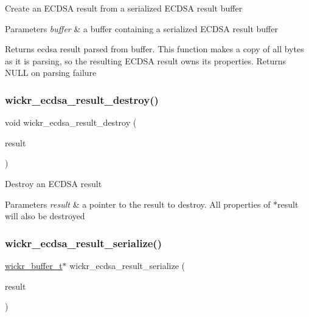 Create an E\+C\+D\+SA result from a serialized E\+C\+D\+SA result buffer


\begin{DoxyParams}{Parameters}
{\em buffer} & a buffer containing a serialized E\+C\+D\+SA result buffer \\
\hline
\end{DoxyParams}
\begin{DoxyReturn}{Returns}
ecdsa result parsed from \textquotesingle{}buffer\textquotesingle{}. This function makes a copy of all bytes as it is parsing, so the resulting E\+C\+D\+SA result owns its properties. Returns N\+U\+LL on parsing failure 
\end{DoxyReturn}
\mbox{\label{group__wickr__ecdsa__result_ga84fb120b34b4b7ede4042009c735ea5d}} 
\subsubsection{\texorpdfstring{wickr\_ecdsa\_result\_destroy()}{wickr\_ecdsa\_result\_destroy()}}
{\footnotesize\ttfamily void wickr\+\_\+ecdsa\+\_\+result\+\_\+destroy (\begin{DoxyParamCaption}\item[{\mbox{\hyperlink{structwickr__ecdsa__result}{wickr\+\_\+ecdsa\+\_\+result\+\_\+t}} $\ast$$\ast$}]{result }\end{DoxyParamCaption})}

Destroy an E\+C\+D\+SA result


\begin{DoxyParams}{Parameters}
{\em result} & a pointer to the result to destroy. All properties of \textquotesingle{}$\ast$result\textquotesingle{} will also be destroyed \\
\hline
\end{DoxyParams}
\mbox{\label{group__wickr__ecdsa__result_ga417d1186e93d6ae4ee4cf701a2bfb1b2}} 
\subsubsection{\texorpdfstring{wickr\_ecdsa\_result\_serialize()}{wickr\_ecdsa\_result\_serialize()}}
{\footnotesize\ttfamily \mbox{\hyperlink{structwickr__buffer}{wickr\+\_\+buffer\+\_\+t}}$\ast$ wickr\+\_\+ecdsa\+\_\+result\+\_\+serialize (\begin{DoxyParamCaption}\item[{const \mbox{\hyperlink{structwickr__ecdsa__result}{wickr\+\_\+ecdsa\+\_\+result\+\_\+t}} $\ast$}]{result }\end{DoxyParamCaption})}

